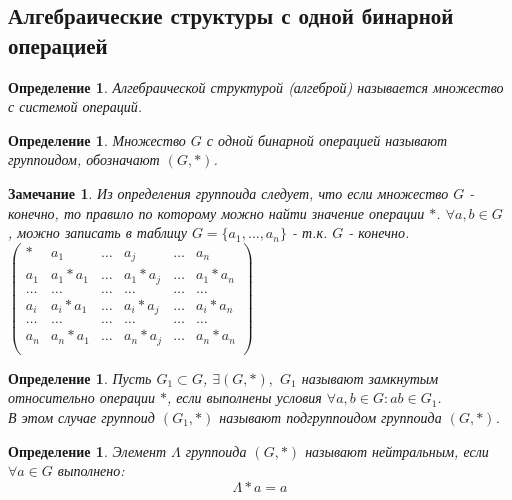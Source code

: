\documentclass[12pt,oneside]{article}
\newtheorem{determ}[theorem]{Определение}
\newtheorem{ffff}[theorem]{Замечание}
\theoremstyle{definition}
\begin{document}
\subsection{Алгебраические структуры с одной бинарной операцией}
\begin{determ}
	Алгебраической структурой (алгеброй) называется множество с системой операций.
\end{determ}

\begin{determ}
	Множество $G$ с одной бинарной операцией называют группоидом, обозначают $(G,*)$.
\end{determ}

\begin{ffff}
	Из определения группоида следует, что если множество $G$ - конечно, то правило по которому можно найти значение операции $*$. $\forall a,b \in G$ , можно записать в таблицу $G=\{a_1, \dots, a_n\}$ - т.к. $G$  - конечно.\\
	$\begin{pmatrix}
		* & a_1 & \dots & a_j & \dots & a_n \\
		a_1& a_1*a_1 & \dots & a_1*a_j & \dots & a_1*a_n \\
		\dots &\dots &\dots &\dots &\dots &\dots \\
		a_i& a_i*a_1 & \dots & a_i*a_j & \dots & a_i*a_n \\
		\dots &\dots &\dots &\dots &\dots &\dots \\
		a_n& a_n*a_1 & \dots & a_n*a_j & \dots & a_n*a_n \\
		
	\end{pmatrix}$
\end{ffff}

\begin{determ}
	Пусть $G_1 \subset G$, $\exists (G,*),$ $G_1$ называют замкнутым относительно операции $*$, если выполнены условия $\forall a,b \in G: ab\in G_1$.\\
	В этом случае группоид $(G_1,*)$ называют подгруппоидом группоида $(G,*)$.
\end{determ}

\begin{determ}
	Элемент $\Lambda$ группоида $(G,*)$ называют нейтральным, если $\forall a \in G$ выполнено:\\
	\begin{equation}
	\Lambda*a=a
	\end{equation}
\end{determ}
\end{document}
